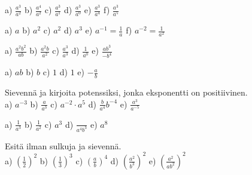 \begin{tehtavasivu}
    \begin{tehtava}
        a) $\frac{a^3}{a^2}$ \qquad
        b) $\frac{a^4}{a^2}$ \qquad
        c) $\frac{a^3}{a^1}$ \qquad
        d) $\frac{a^3}{a^0}$ \qquad
        e) $\frac{a^3}{a^4}$ \qquad
        f) $\frac{a^3}{a^5}$
        
        \begin{vastaus}
            a) $a$ \qquad
            b) $a^2$ \qquad
            c) $a^2$ \qquad
            d) $a^3$ \qquad
            e) $a^{-1} = \frac{1}{a}$ \qquad
            f) $a^{-2} = \frac{1}{a^2}$
        \end{vastaus}
    \end{tehtava}
    
    \begin{tehtava}
        a) $\frac{a^2b^2}{ab}$ \qquad
        b) $\frac{a^2b}{a^2}$ \qquad
        c) $\frac{a^3}{a^3}$ \qquad
        d) $\frac{1}{a^0}$ \qquad
        e) $\frac{ab^3}{-b^4}$
        
        \begin{vastaus}
            a) $ab$ \qquad
            b) $b$ \qquad
            c) $1$ \qquad
            d) $1$ \qquad
            e) $-\frac{a}{b}$
        \end{vastaus}
    \end{tehtava}
    
   
    
    \begin{tehtava}
         Sievennä ja kirjoita potenssiksi, jonka eksponentti on positiivinen.\\
        a) $a^{-3}$ \qquad
        b) $\frac{a}{a^3}$ \qquad
        c) $a^{-2}\cdot a^5$ \qquad
        d) $\frac{b}{a^4}b^{-4}$ \qquad
        e) $\frac{a^3}{a^{-5}}$
        
        \begin{vastaus}
            a) $\frac{1}{a^3}$ \qquad
            b) $\frac{1}{a^2}$ \qquad
            c) $a^3$ \qquad
            d) $\frac{}{a^4b^3}$ \qquad
            e) $a^8$
        \end{vastaus}
    \end{tehtava}
    
    
    
    \begin{tehtava}
        Esitä ilman sulkuja ja sievennä. \\
        a) $(\frac{1}{2})^2$ \qquad
        b) $(\frac{1}{3})^3$ \qquad
        c) $(\frac{a}{b})^4$ \qquad
        d) $(\frac{a^2}{b^3})^2$ \qquad
        e) $\left(\frac{a^2}{ab^2}\right)^2$
        

\end{tehtava}
\end{tehtavasivu}
